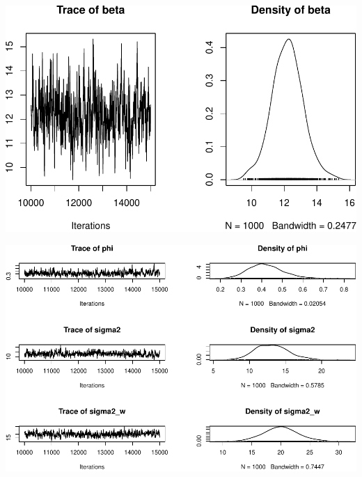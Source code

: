 \documentclass[11pt,ignorenonframetext,]{beamer}
\begin{document}
\begin{frame}{}
\protect\hypertarget{section-8}{}

\begin{center}\includegraphics[width=\textwidth]{Lec19_files/figure-beamer/unnamed-chunk-46-1} \end{center}

\end{frame}

\begin{frame}{}
\protect\hypertarget{section-9}{}

\begin{center}\includegraphics[width=\textwidth]{Lec19_files/figure-beamer/unnamed-chunk-47-1} \end{center}

\end{frame}
\end{document}
